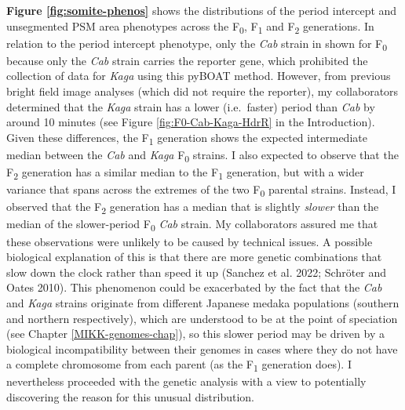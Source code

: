 \documentclass[
]{book}
\begin{document}
\textbf{Figure \ref{fig:somite-phenos}} shows the distributions of the period intercept and unsegmented PSM area phenotypes across the F\textsubscript{0}, F\textsubscript{1} and F\textsubscript{2} generations. In relation to the period intercept phenotype, only the \emph{Cab} strain in shown for F\textsubscript{0} because only the \emph{Cab} strain carries the reporter gene, which prohibited the collection of data for \emph{Kaga} using this pyBOAT method. However, from previous bright field image analyses (which did not require the reporter), my collaborators determined that the \emph{Kaga} strain has a lower (i.e.~faster) period than \emph{Cab} by around 10 minutes (see Figure \ref{fig:F0-Cab-Kaga-HdrR} in the Introduction). Given these differences, the F\textsubscript{1} generation shows the expected intermediate median between the \emph{Cab} and \emph{Kaga} F\textsubscript{0} strains. I also expected to observe that the F\textsubscript{2} generation has a similar median to the F\textsubscript{1} generation, but with a wider variance that spans across the extremes of the two F\textsubscript{0} parental strains. Instead, I observed that the F\textsubscript{2} generation has a median that is slightly \emph{slower} than the median of the slower-period F\textsubscript{0} \emph{Cab} strain. My collaborators assured me that these observations were unlikely to be caused by technical issues. A possible biological explanation of this is that there are more genetic combinations that slow down the clock rather than speed it up (Sanchez et al. 2022; Schröter and Oates 2010). This phenomenon could be exacerbated by the fact that the \emph{Cab} and \emph{Kaga} strains originate from different Japanese medaka populations (southern and northern respectively), which are understood to be at the point of speciation (see Chapter \ref{MIKK-genomes-chap}), so this slower period may be driven by a biological incompatibility between their genomes in cases where they do not have a complete chromosome from each parent (as the F\textsubscript{1} generation does). I nevertheless proceeded with the genetic analysis with a view to potentially discovering the reason for this unusual distribution.
\end{document}
